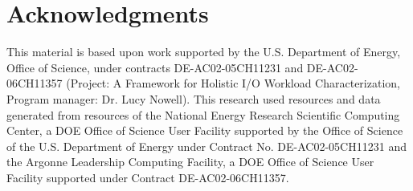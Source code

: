 \section*{Acknowledgments}

This material is based upon work supported by the U.S. Department of Energy,
Office of Science, under contracts DE-AC02-05CH11231 and DE-AC02-06CH11357
(Project: A Framework for Holistic I/O Workload Characterization, Program
manager: Dr. Lucy Nowell).
This research used resources and data generated from resources of the
National Energy Research Scientific Computing Center, a DOE Office of
Science
User Facility supported by the Office of Science of the U.S. Department of
Energy under Contract No. DE-AC02-05CH11231 and the Argonne Leadership
Computing Facility, a DOE Office of Science User Facility supported under
Contract DE-AC02-06CH11357.
